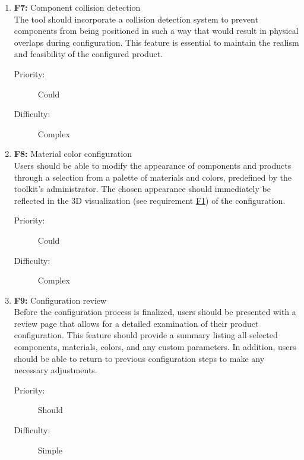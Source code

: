 \begin{enumerate}
\item \textbf{F7:} Component collision detection
\vspace{2pt}
\\The tool should incorporate a collision detection system to prevent components from being positioned in such a way that would result in physical overlaps during configuration. This feature is essential to maintain the realism and feasibility of the configured product.
\begin{description}
    \item[Priority:] Could
    \item[Difficulty:] Complex
\end{description}
\vspace{4pt}

\item \textbf{F8:} \label{itm:F8} Material color configuration
\vspace{2pt}
\\Users should be able to modify the appearance of components and products through a selection from a palette of materials and colors, predefined by the toolkit's administrator. The chosen appearance should immediately be reflected in the 3D visualization (see requirement \hyperref[itm:F1]{F1}) of the configuration.
\begin{description}
    \item[Priority:] Could
    \item[Difficulty:] Complex
\end{description}
\vspace{4pt}

\item \textbf{F9:} Configuration review
\vspace{2pt}
\\Before the configuration process is finalized, users should be presented with a review page that allows for a detailed examination of their product configuration. This feature should provide a summary listing all selected components, materials, colors, and any custom parameters. In addition, users should be able to return to previous configuration steps to make any necessary adjustments.
\begin{description}
    \item[Priority:] Should
    \item[Difficulty:] Simple
\end{description}
\vspace{4pt}


\end{enumerate}
